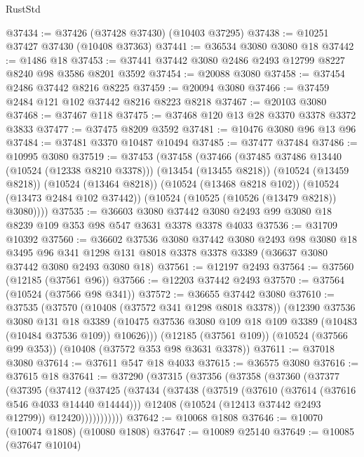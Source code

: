 \begin{lexlean}{RustStd}
\begin{coremodule}
@37434 := @37426 (@37428 @37430) (@10403 @37295)
@37438 := @10251 @37427 @37430 (@10408 @37363)
@37441 := @36534 @3080 @3080 @18
@37442 := @1486 @18
@37453 := @37441 @37442 @3080 @2486 @2493 @12799 @8227 @8240 @98 @3586 @8201 @3592
@37454 := @20088 @3080
@37458 := @37454 @2486 @37442 @8216 @8225
@37459 := @20094 @3080
@37466 := @37459 @2484 @121 @102 @37442 @8216 @8223 @8218
@37467 := @20103 @3080
@37468 := @37467 @118
@37475 := @37468 @120 @13 @28 @3370 @3378 @3372 @3833
@37477 := @37475 @8209 @3592
@37481 := @10476 @3080 @96 @13 @96
@37484 := @37481 @3370 @10487 @10494
@37485 := @37477 @37484
@37486 := @10995 @3080
@37519 := @37453
    (@37458
      (@37466
        (@37485 @37486 @13440 (@10524 (@12338 @8210 @3378)))
        (@13454 (@13455 @8218))
        (@10524 (@13459 @8218))
        (@10524 (@13464 @8218))
        (@10524 (@13468 @8218 @102))
        (@10524 (@13473 @2484 @102 @37442))
        (@10524 (@10525 (@10526 (@13479 @8218)) @3080))))
@37535 := @36603
    @3080
    @37442
    @3080
    @2493
    @99
    @3080
    @18
    @8239
    @109
    @353
    @98
    @547
    @3631
    @3378
    @3378
    @4033
@37536 := @31709 @10392
@37560 := @36602
    @37536
    @3080
    @37442
    @3080
    @2493
    @98
    @3080
    @18
    @3495
    @96
    @341
    @1298
    @131
    @8018
    @3378
    @3378
    @3389
    (@36637 @3080 @37442 @3080 @2493 @3080 @18)
@37561 := @12197 @2493
@37564 := @37560 (@12185 (@37561 @96))
@37566 := @12203 @37442 @2493
@37570 := @37564 (@10524 (@37566 @98 @341))
@37572 := @36655 @37442 @3080
@37610 := @37535
    (@37570
      (@10408 (@37572 @341 @1298 @8018 @3378))
      (@12390
        @37536
        @3080
        @131
        @18
        @3389
        (@10475 @37536 @3080 @109 @18 @109 @3389 (@10483 (@10484 @37536 @109)) @10626)))
    (@12185 (@37561 @109))
    (@10524 (@37566 @99 @353))
    (@10408 (@37572 @353 @98 @3631 @3378))
@37611 := @37018 @3080
@37614 := @37611 @547 @18 @4033
@37615 := @36575 @3080
@37616 := @37615 @18
@37641 := @37290
    (@37315
      (@37356
        (@37358
          (@37360
            (@37377
              (@37395
                (@37412
                  (@37425
                    (@37434
                      (@37438
                        (@37519
                          (@37610 (@37614 (@37616 @546 @4033 @14440 @14444)))
                          @12408
                          (@10524 (@12413 @37442 @2493 @12799))
                          @12420)))))))))))
@37642 := @10068 @1808
@37646 := @10070 (@10074 @1808) (@10080 @1808)
@37647 := @10089 @25140
@37649 := @10085 (@37647 @10104)

\end{coremodule}
\end{lexlean}
